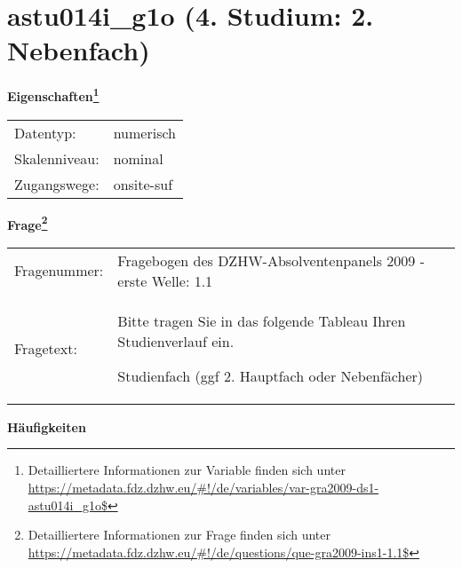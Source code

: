 
    \setcounter{footnote}{0}

    \vspace*{-1.8cm}
	\section{astu014i\_g1o (4. Studium: 2. Nebenfach)}
	\label{section:astu014i_g1o}



    \vspace*{0.5cm}
    \noindent\textbf{Eigenschaften\footnote{Detailliertere Informationen zur Variable finden sich unter
		\url{https://metadata.fdz.dzhw.eu/\#!/de/variables/var-gra2009-ds1-astu014i_g1o$}}}\\
	\begin{tabularx}{\hsize}{@{}lX}
	Datentyp: & numerisch \\
	Skalenniveau: & nominal \\
	Zugangswege: &
	  onsite-suf
 \\
    \end{tabularx}



				\vspace*{0.5cm}
                \noindent\textbf{Frage\footnote{Detailliertere Informationen zur Frage finden sich unter
		              \url{https://metadata.fdz.dzhw.eu/\#!/de/questions/que-gra2009-ins1-1.1$}}}\\
				\begin{tabularx}{\hsize}{@{}lX}
					Fragenummer: &
					  Fragebogen des DZHW-Absolventenpanels 2009 - erste Welle:
					  1.1
 \\
					Fragetext: & Bitte tragen Sie in das folgende Tableau Ihren Studienverlauf ein.\par  Studienfach (ggf 2. Hauptfach oder Nebenfächer) \\
				\end{tabularx}





        		\vspace*{0.5cm}
                \noindent\textbf{Häufigkeiten}

